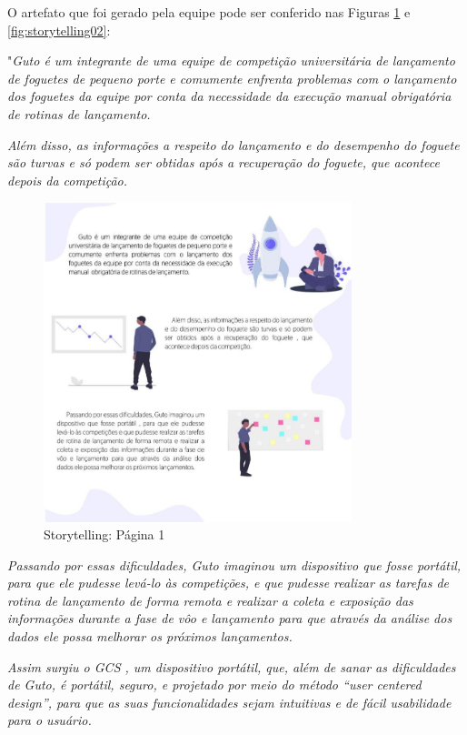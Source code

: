 \par O artefato que foi gerado pela equipe pode ser conferido nas Figuras \ref{fig:storytelling01} e \ref{fig:storytelling02}:

"\textit{Guto é um integrante de uma equipe de competição universitária de lançamento de foguetes de pequeno porte e comumente enfrenta problemas com o lançamento dos foguetes da equipe por conta da necessidade da execução manual  obrigatória de rotinas de lançamento.}
    
\textit{Além disso, as informações a respeito do lançamento e do desempenho do foguete são turvas e só podem ser obtidas após a recuperação do foguete, que acontece depois da competição.}

\begin{figure}[H]
\centering
\includegraphics[width=0.8\textwidth]{figuras/storytelling1.jpg}
\caption{Storytelling: Página 1}
\label{fig:storytelling01}
\end{figure}

\textit{Passando por essas dificuldades, Guto imaginou um dispositivo que fosse portátil, para que ele pudesse levá-lo às competições, e que pudesse realizar as tarefas de rotina de lançamento de forma remota e realizar a coleta e exposição das informações durante a fase de vôo e lançamento para que através da análise dos dados ele possa melhorar os próximos lançamentos.}

\textit{Assim surgiu o  GCS , um dispositivo portátil, que, além de sanar as dificuldades de Guto, é portátil, seguro, e projetado por meio do método “user centered design”, para que as suas funcionalidades sejam intuitivas e de fácil usabilidade para o usuário.}

